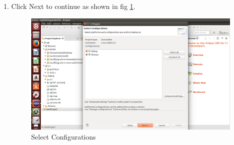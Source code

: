 \documentclass[20pt]{report}
\begin{document}
\begin{enumerate}
\item Click Next to continue as shown in fig \ref{ecl3}. 
\begin{figure}[!h]
\centering
\includegraphics[width=0.7\linewidth]{ecl3}
\caption{Select Configurations}
\label{ecl3}
\end{figure}


\end{enumerate}
\end{document}
